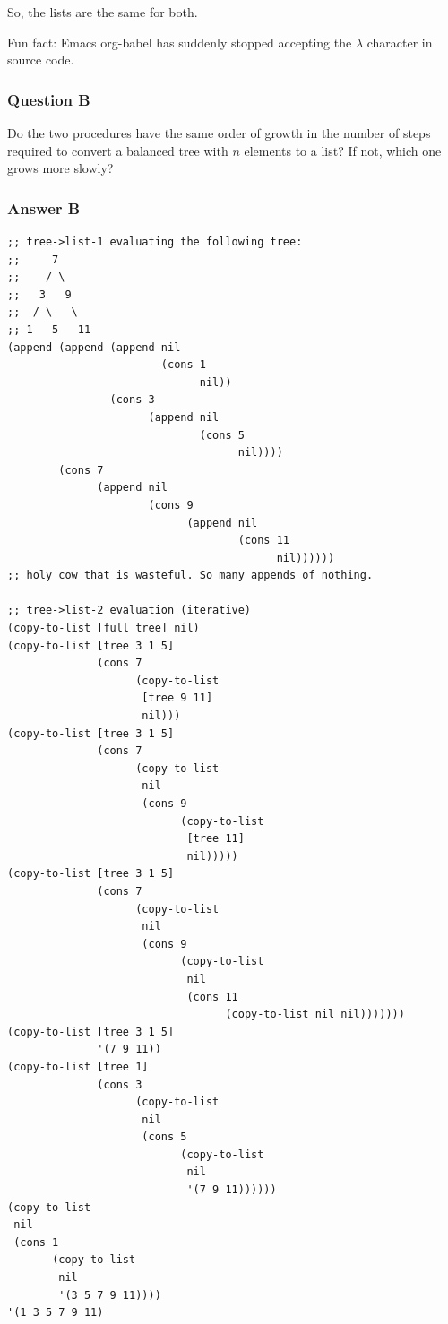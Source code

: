 \documentclass[final,fleqn,titlepage,twoside]{article}
\begin{document}
So, the lists are the same for both.

Fun fact: Emacs org-babel has suddenly stopped accepting the \(\lambda\) character
in source code.

\subsubsection{Question B}
\label{sec:org41d0ce3}
Do the two procedures have the same order of growth in the number of steps
required to convert a balanced tree with \(n\) elements to a list? If not, which
one grows more slowly?

\subsubsection{Answer B}
\label{sec:orgc28ba58}
\begin{verbatim}
;; tree->list-1 evaluating the following tree:
;;     7
;;    / \
;;   3   9
;;  / \   \
;; 1   5   11
(append (append (append nil
                        (cons 1
                              nil))
                (cons 3
                      (append nil
                              (cons 5
                                    nil))))
        (cons 7
              (append nil
                      (cons 9
                            (append nil
                                    (cons 11
                                          nil))))))
;; holy cow that is wasteful. So many appends of nothing.

;; tree->list-2 evaluation (iterative)
(copy-to-list [full tree] nil)
(copy-to-list [tree 3 1 5]
              (cons 7
                    (copy-to-list
                     [tree 9 11]
                     nil)))
(copy-to-list [tree 3 1 5]
              (cons 7
                    (copy-to-list
                     nil
                     (cons 9
                           (copy-to-list
                            [tree 11]
                            nil)))))
(copy-to-list [tree 3 1 5]
              (cons 7
                    (copy-to-list
                     nil
                     (cons 9
                           (copy-to-list
                            nil
                            (cons 11
                                  (copy-to-list nil nil)))))))
(copy-to-list [tree 3 1 5]
              '(7 9 11))
(copy-to-list [tree 1]
              (cons 3
                    (copy-to-list
                     nil
                     (cons 5
                           (copy-to-list
                            nil
                            '(7 9 11))))))
(copy-to-list
 nil
 (cons 1
       (copy-to-list
        nil
        '(3 5 7 9 11))))
'(1 3 5 7 9 11)
\end{verbatim}
\end{document}
